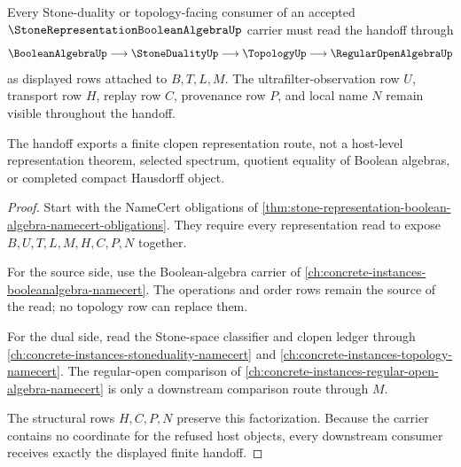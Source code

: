 \begin{theorem}
\label{thm:stone-representation-boolean-algebra-duality-handoff}
Every Stone-duality or topology-facing consumer of an accepted $\StoneRepresentationBooleanAlgebraUp$ carrier must read the handoff through
$$
\BooleanAlgebraUp \longrightarrow \StoneDualityUp \longrightarrow \TopologyUp \longrightarrow \RegularOpenAlgebraUp
$$
as displayed rows attached to $B,T,L,M$. The ultrafilter-observation row $U$, transport row $H$, replay row $C$, provenance row $P$, and local name $N$ remain visible throughout the handoff.

The handoff exports a finite clopen representation route, not a host-level representation theorem, selected spectrum, quotient equality of Boolean algebras, or completed compact Hausdorff object.
\end{theorem}
\begin{proof}
Start with the NameCert obligations of \autoref{thm:stone-representation-boolean-algebra-namecert-obligations}. They require every representation read to expose $B,U,T,L,M,H,C,P,N$ together.

For the source side, use the Boolean-algebra carrier of \autoref{ch:concrete-instances-booleanalgebra-namecert}. The operations and order rows remain the source of the read; no topology row can replace them.

For the dual side, read the Stone-space classifier and clopen ledger through \autoref{ch:concrete-instances-stoneduality-namecert} and \autoref{ch:concrete-instances-topology-namecert}. The regular-open comparison of \autoref{ch:concrete-instances-regular-open-algebra-namecert} is only a downstream comparison route through $M$.

The structural rows $H,C,P,N$ preserve this factorization. Because the carrier contains no coordinate for the refused host objects, every downstream consumer receives exactly the displayed finite handoff.
\end{proof}


